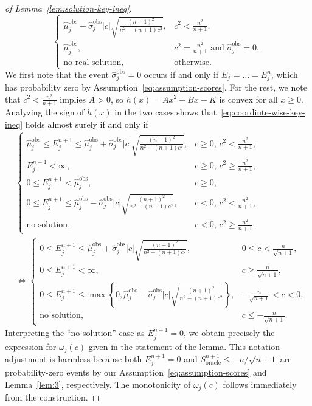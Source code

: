\begin{proof}[of Lemma~\ref{lem:solution-key-ineq}]
\[\begin{cases}
    \hat{\mu}^\mathrm{obs}_j \pm \hat{\sigma}^\mathrm{obs}_j|c|\sqrt{\tfrac{(n+1)^2}{n^2-(n+1)c^2}}, & c^2 < \tfrac{n^2}{n+1},\\
    \hat{\mu}^\mathrm{obs}_j, & c^2 = \tfrac{n^2}{n+1} \text{ and } \hat{\sigma}^\mathrm{obs}_j = 0,\\
    \text{no real solution}, &\text{otherwise}.
\end{cases}
\]
We first note that the event $\hat{\sigma}^\mathrm{obs}_j = 0$ occurs if and only if $E^1_j=\ldots=E^n_j$, which has probability zero by Assumption~\ref{eq:assumption-scores}. For the rest, we note that $c^2 < \tfrac{n^2}{n+1}$ implies $A>0$, so $h(x) = Ax^2+Bx +K$ is convex for all $x \geq 0$. 
Analyzing the sign of $h(x)$ in the two cases shows that~\eqref{eq:coordinte-wise-key-ineq} holds almost surely if and only if
\begin{align*}
    &\begin{cases}
    \hat{\mu}^\mathrm{obs}_j \leq E^{n+1}_j \leq \hat{\mu}^\mathrm{obs}_j+\hat{\sigma}^\mathrm{obs}_j|c|\sqrt{\tfrac{(n+1)^2}{n^2-(n+1)c^2}}, & c \geq 0,\, c^2 < \tfrac{n^2}{n+1}, \\[0.5em]
    E^{n+1}_j < \infty , & c \geq 0,\, c^2 \geq \tfrac{n^2}{n+1}, \\[0.5em]
    0 \leq E^{n+1}_j < \hat{\mu}^\mathrm{obs}_j, & c \geq 0, \\[0.5em]
    0\leq E^{n+1}_j \leq \hat{\mu}^\mathrm{obs}_j-\hat{\sigma}^\mathrm{obs}_j|c|\sqrt{\tfrac{(n+1)^2}{n^2-(n+1)c^2}}, & c < 0,\, c^2 < \tfrac{n^2}{n+1}, \\[0.5em]
    \text{no solution}, & c < 0,\, c^2 \geq \tfrac{n^2}{n+1}.
    \end{cases}\\
    &\iff \begin{cases}
    0 \leq E^{n+1}_j \leq \hat{\mu}^\mathrm{obs}_j+\hat{\sigma}^\mathrm{obs}_j|c|\sqrt{\tfrac{(n+1)^2}{n^2-(n+1)c^2}}, & 0\leq c < \tfrac{n}{\sqrt{n+1}}, \\[0.5em]
    0\leq E^{n+1}_j < \infty , & c\geq\tfrac{n}{\sqrt{n+1}}, \\[0.5em]
    0\leq E^{n+1}_j \leq \max\left\{0, \hat{\mu}^\mathrm{obs}_j-\hat{\sigma}^\mathrm{obs}_j|c|\sqrt{\tfrac{(n+1)^2}{n^2-(n+1)c^2}}\right\}, & -\tfrac{n}{\sqrt{n+1}} < c<0, \\[0.5em]
    \text{no solution}, & c \leq - \tfrac{n}{\sqrt{n+1}}.
    \end{cases}
\end{align*}
Interpreting the ``no-solution'' case as $E^{n+1}_j = 0$, we obtain precisely the expression for $\omega_j(c)$ given in the statement of the lemma. This notation adjustment is harmless because both $E^{n+1}_j = 0$ and $S^{n+1}_{\mathrm{oracle}} \leq -n/\sqrt{n+1}$ are probability-zero events by our Assumption~\ref{eq:assumption-scores} and Lemma~\ref{lem:3}, respectively.
The monotonicity of $\omega_j(c)$ follows immediately from the construction.
\end{proof}

